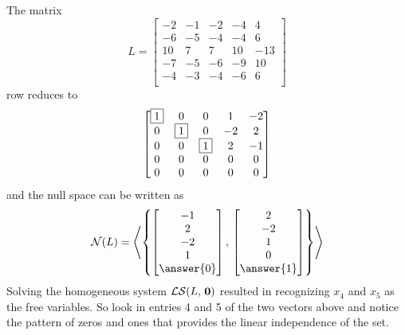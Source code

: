 \documentclass{ximera}
\begin{document}
\begin{example}%
  The matrix
  \[
    L = \begin{bmatrix}
      -2 & -1 & -2 & -4 & 4 \\
      -6 & -5 &  -4 &  -4 & 6 \\
      10 & 7 & 7 &  10 & -13 \\
      -7 & -5 &  -6 & -9 & 10 \\
      -4 &  -3 & -4 & -6 & 6 \\
    \end{bmatrix}
  \]
  row reduces to
  \[
    \begin{bmatrix}
      \fbox{1} & 0 & 0 & 1 & -2 \\
      0 & \fbox{1} & 0 &  -2 & 2 \\
      0 & 0 & \fbox{1} &  2 &  -1 \\
      0 & 0 & 0 & 0 &  0 \\
      0 & 0 & 0 & 0 &  0
    \end{bmatrix}
  \]
  and the null space can be written as
  \[
    \nsp{L} = \spn{\set{\colvector{-1\\2\\-2\\1\\\answer{0}},\,\colvector{2\\-2\\1\\0\\\answer{1}}}}
  \]
  Solving the homogeneous system $\mathcal{LS}\!\left(L,\,\mathbf{0}\right)$ resulted in
  recognizing $x_4$ and $x_5$ as the free variables.  So look in
  entries 4 and 5 of the two vectors above and notice the pattern of
  zeros and ones that provides the linear independence of the set.
\end{example}
\end{document}
